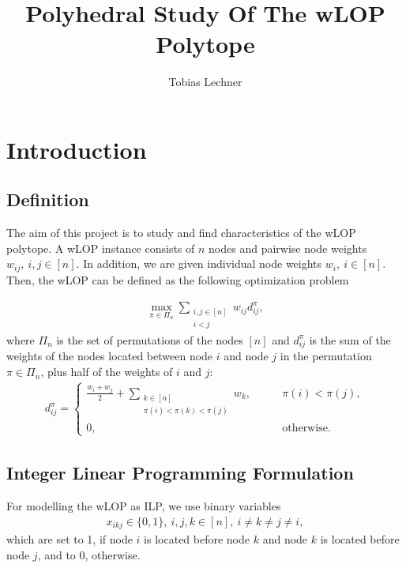 \documentclass{scrartcl}
\author{Tobias Lechner}
\title{Polyhedral Study Of The wLOP Polytope}
\theoremstyle{plain}
\begin{document}
\maketitle

\tableofcontents

\newpage
\section{Introduction}

\subsection{Definition}

The aim of this project is to study and find characteristics of the wLOP polytope. A wLOP instance consists of $n$ nodes and pairwise node weights $w_{ij},\ i,j \in [n]$. In addition, we are given individual node weights $w_{i},\ i \in [n]$. Then, the wLOP can be defined as the following optimization problem

\begin{align*}
\max_{\pi \in \Pi_n} \sum_{\substack{i,j \in [n]\\i<j}}w_{ij}d_{ij}^{\pi},
\end{align*}\label{def:wlop}%
where $\Pi_{n}$ is the set of permutations of the 
nodes $[n]$ and $d_{ij}^{\pi}$ is the sum of the weights of the nodes located between
node $i$ and node $j$ in the permutation $\pi \in \Pi_n$, plus half of the weights of  $i$ and $j$:
\begin{align*}
d_{ij}^{\pi} = \begin{cases} \frac{w_i+w_j}{2} + \sum\limits_{\substack{k \in [n]\\\pi(i) <
		\pi(k) < \pi(j)}}w_k,\qquad  & \pi(i) < \pi(j),\\
0, & \text{otherwise}.
\end{cases}
\end{align*}

\subsection{Integer Linear Programming Formulation}

For modelling the wLOP as ILP, we use binary variables \begin{align} x_{ikj} \in \{0,1\},\ i,j,k \in [n],\ i \neq k \neq j \neq i, \label{var} \end{align} which are set to 1, if node $i$ is located before node $k$ and node $k$ is located before node $j$, and to 0, otherwise. 
\end{document}
